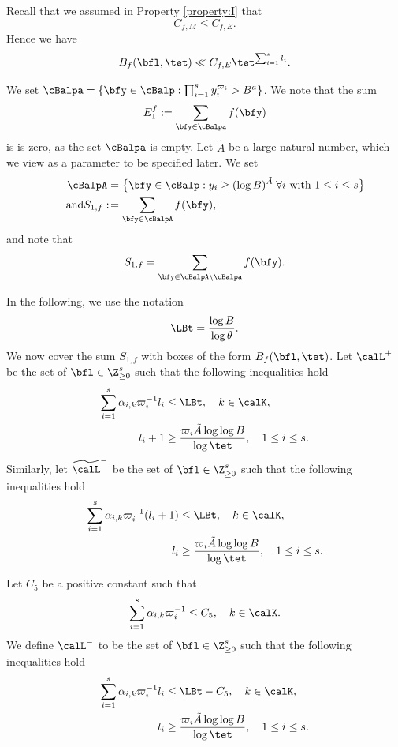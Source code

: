 Recall that we assumed in Property \ref{property:I} that
\begin{equation*}
C_{f,M}\leq C_{f,E}.
\end{equation*}
Hence we have
\begin{equation}\label{eqn22}
B_f(\bfl,\tet)\ll C_{f,E} \tet^{\sum_{i=1}^s l_i}.
\end{equation}

We set $\cBalpa=\{\bfy\in\cBalp:\prod_{i=1}^sy_i^{\varpi_i}>B^a\}$. We note that the sum
\[
E_1^f:= \sum_{\bfy\in\cBalpa}f(\bfy)
\]
is is zero, as the set $\cBalpa$ is empty.
Let $\tilde{A}$ be a large natural number, which we view as a parameter to be specified later.
We set
\begin{align*}
\cBalpA&=\bigl\{\bfy\in\cBalp:y_i\geq(\log B)^{\tilde{A}}\; \forall i \text{ with }1\leq i\leq s\bigr\}\\
\tag*{and}
S_{1,f}:\!&= \sum_{\bfy\in \cBalpA}f(\bfy),
\end{align*}
and note that
\[
S_{1,f}= \sum_{\bfy\in \cBalpA\setminus\cBalpa}f(\bfy).
\]

In the following, we use the notation
\[\LBt=\frac{\log B}{\log\theta}.\]
We now cover the sum $S_{1,f}$ with boxes of the form $B_f(\bfl,\tet)$. Let $\calL^+$ be the set of $\bfl\in \Z_{\geq 0}^s$ such that the following inequalities hold
\begin{align*}
\sum_{i=1}^s \alpha_{i,k} \varpi_i^{-1}l_i&\leq \LBt,\quad k\in \calK,\\
l_i+1&\geq \frac{\varpi_i \tilde{A} \log \log B}{\log \tet},\quad 1\leq i\leq s.
\end{align*}
Similarly, let $\widetilde{\calL}^-$ be the set of $\bfl\in \Z_{\geq 0}^s$ such that the following inequalities hold
\begin{align*}
\sum_{i=1}^s \alpha_{i,k} \varpi_i^{-1}(l_i +1)&\leq \LBt,\quad k\in \calK,\\
l_i&\geq \frac{\varpi_i \tilde{A} \log \log B}{\log \tet},\quad 1\leq i\leq s.
\end{align*}

Let $C_5$ be a positive constant such that
\[
\sum_{i=1}^s \alpha_{i,k} \varpi_i^{-1}\leq C_5, \quad k\in \calK.
\]
We define $\calL^-$ to be the set of $\bfl\in \Z_{\geq 0}^s$ such that the following inequalities hold
\begin{align*}
\sum_{i=1}^s \alpha_{i,k} \varpi_i^{-1}l_i &\leq \LBt - C_5, \quad k\in \calK,\\
l_i&\geq \frac{\varpi_i \tilde{A} \log \log B}{\log \tet},\quad 1\leq i\leq s.
\end{align*}

